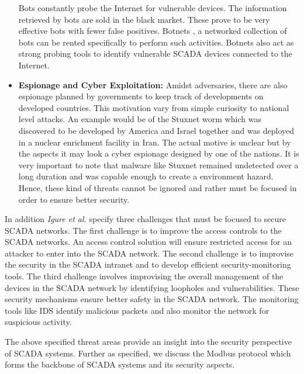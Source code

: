 \documentclass[article,msc=informatik,type=msc,colorback,accentcolor=tud9c]{tudthesis}
\begin{document}
\begin{itemize}
	
	 Bots constantly probe the Internet for vulnerable devices. The information retrieved by bots are sold in the black market. These prove to be very effective bots with fewer false positives. Botnets \cite{ianelli2005botnets}, a networked collection of bots can be rented specifically to perform such activities. Botnets also act as strong probing tools to identify vulnerable \ac{SCADA} devices connected to the Internet.
	 
	 
	 \vspace{5mm}
	 \item\textbf{Espionage and Cyber Exploitation:} Amidst adversaries, there are also espionage planned by governments to keep track of developments on developed countries. This motivation vary from simple curiosity to national level attacks. An example would be of the Stuxnet worm which was discovered to be developed by America and Israel together and was deployed in a nuclear enrichment facility in Iran. The actual motive is unclear but by the aspects it may look a cyber espionage designed by one of the nations. It is very important to note that malware like Stuxnet remained undetected over a long duration and was capable enough to create a environment hazard. Hence, these kind of threats cannot be ignored and rather must be focused in order to ensure better security. 
	 
	 \end{itemize}
	 
	 In addition \textit{Igure et al.}\cite{igure2006security}  specify three challenges that must be focused to secure \ac{SCADA} networks. The first challenge is to improve the access controls
	 to the \ac{SCADA} networks. An access control solution will ensure restricted access for an attacker to enter into the \ac{SCADA} network. The second challenge is to improvise the security in the \ac{SCADA} intranet and to develop efficient security-monitoring tools.
	 The third challenge involves improvising the overall management of the devices in the \ac{SCADA} network by identifying loopholes and vulnerabilities.  These security mechanisms ensure better safety in the \ac{SCADA} network. The monitoring tools like \ac{IDS} identify malicious packets and also monitor the network for suspicious activity. 
	 
	\vspace{3mm}
    The above specified threat areas provide an insight into the security perspective of \ac{SCADA} systems.
    Further as specified, we discuss the Modbus protocol which forms the backbone of \ac{SCADA} systems and its security aspects.
    
\end{document}
